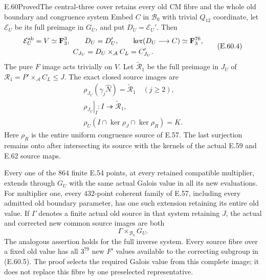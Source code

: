 \begin{statement}{E.60}{Proved}{The central-three cover retains every old CM fibre and the whole old boundary and congruence system}
Embed $C$ in $\mathcal B_0$ with trivial $Q_{12}$ coordinate,
let $\mathcal E_U$ be its full preimage in $G_U$, and put
$D_U=\mathcal E_U'$. Then
\[
 \begin{gathered}
 \mathcal E_U^{\rm ab}=V\simeq\mathbf F_3^3,
 \qquad D_U=D_U',\qquad
 \ker(D_U\longrightarrow C)\simeq\mathbf F_3^{76},\\
 C_{J_U}=D_U\times_{\mathcal A}C_L=C_{J_U}'.
 \end{gathered}
 \tag{E.60.4}
\]
The pure $F$ image acts trivially on $V$.
Let $\widetilde{\mathcal R}_1$ be the full preimage in $J_U$
of $\mathcal R_1=P'\times_{\mathcal A}C_L\leq J$.
The exact closed source images are
\[
 \begin{gathered}
 \rho_{J_U}(\gamma_j\widehat N)=\widetilde{\mathcal R}_1
                          \quad(j\geq2),\\
 \left.\rho_{J_U}\right|_I:I\twoheadrightarrow
                                  \widetilde{\mathcal R}_1,\\
 \rho_U(I\cap\ker\rho_J\cap\ker\rho_R)=K.
 \end{gathered}
 \tag{E.60.5}
\]
Here $\rho_R$ is the entire uniform congruence source of E.57.
The last surjection remains onto after intersecting its source
with the kernels of the actual E.59 and E.62 source maps.

Every one of the $864$ finite E.54 points, at every retained
compatible multiplier, extends through $G_U$ with the same
actual Galois value in all its new evaluations. For multiplier
one, every $432$-point coherent family of E.57, including every
admitted old boundary parameter, has one such extension retaining
its entire old value. If $\Gamma$ denotes a finite actual old
source in that system retaining $J$, the actual and corrected
new common source images are both
\[
                         \Gamma\times_{\mathcal B_0}G_U.
 \tag{E.60.6}
\]
The analogous assertion holds for the full inverse system.
Every source fibre over a fixed old value has all $3^{79}$
new $F'$ values available to the correcting subgroup in
\textup{(E.60.5)}. The proof selects the required Galois value
from this complete image; it does not replace this fibre by
one preselected representative.


\end{statement}
